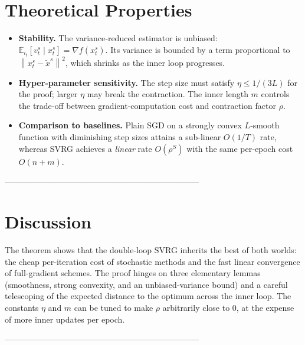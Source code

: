 \documentclass{article}
\newcommand{\E}{\mathbb{E}}
\newcommand{\norm}[1]{\left\|#1\right\|}
\newcommand{\grad}{\nabla}
\begin{document}
\section*{Theoretical Properties}
\begin{itemize}[noitemsep]
    \item \textbf{Stability.} The variance‑reduced estimator is unbiased:
    $\E_{i_t}[v_{t}^{s}\mid x_{t}^{s}]=\grad f(x_{t}^{s})$.
    Its variance is bounded by a term proportional to $\norm{x_{t}^{s}-\tilde{x}^{s}}^{2}$, which shrinks as the inner loop progresses.
    \item \textbf{Hyper‑parameter sensitivity.}
    The step size must satisfy $\eta\le 1/(3L)$ for the proof; larger $\eta$ may break the contraction.
    The inner length $m$ controls the trade‑off between gradient‑computation cost and contraction factor $\rho$.
    \item \textbf{Comparison to baselines.}
    Plain SGD on a strongly convex $L$‑smooth function with diminishing step sizes attains a sub‑linear $O(1/T)$ rate, whereas SVRG achieves a \emph{linear} rate $O(\rho^{S})$ with the same per‑epoch cost $O(n+m)$.
\end{itemize}

-----------------------------------------------------------------------

\section*{Discussion}
The theorem shows that the double‑loop SVRG inherits the best of both worlds: the cheap per‑iteration cost of stochastic methods and the fast linear convergence of full‑gradient schemes.  The proof hinges on three elementary lemmas (smoothness, strong convexity, and an unbiased‑variance bound) and a careful telescoping of the expected distance to the optimum across the inner loop.  The constants $\eta$ and $m$ can be tuned to make $\rho$ arbitrarily close to $0$, at the expense of more inner updates per epoch.

-----------------------------------------------------------------------
\end{document}

